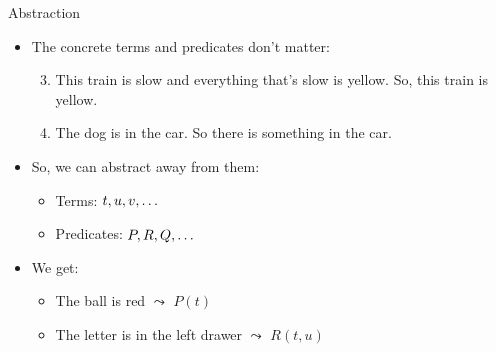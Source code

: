 \begin{frame}{Abstraction}

	\begin{itemize}
	
		\item The concrete terms and predicates don't matter:
				\begin{enumerate}[(1')]
		\setcounter{enumii}{2}
	
		\item This train is slow and everything that's slow is yellow. So, this train is yellow.
		
		\item The dog is in the car. So there is something in the car.
	
	\end{enumerate}

	\item So, we can abstract away from them:
		
			\begin{itemize}
			
				\item Terms: $t,u,v,\mathellipsis$
				
				\item Predicates: $P,R,Q,\mathellipsis$
			
			\end{itemize}
			
	\item We get:
	
		\begin{itemize}
		
			\item The ball is red $\leadsto$ $P(t)$
			
			\item The letter is in the left drawer $\leadsto$ $R(t,u)$
		
		\end{itemize}

	
	\end{itemize}

\end{frame}

